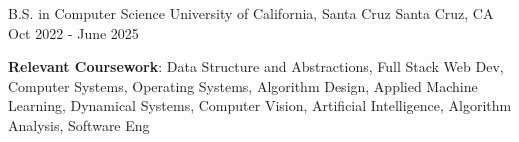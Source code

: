 \vspace{-2.0mm}
\begin{cventries}

  \cventry
    {B.S. in Computer Science} %
    {University of California, Santa Cruz} %
    {Santa Cruz, CA} %
    {Oct 2022 - June 2025} %
    {
      \begin{cvitems} %
        \item {\textbf{Relevant Coursework}: Data Structure and Abstractions, Full Stack Web Dev, Computer Systems, Operating Systems, Algorithm Design, Applied Machine Learning, Dynamical Systems, Computer Vision, Artificial Intelligence, Algorithm Analysis, Software Eng}
      \end{cvitems}
    }
\end{cventries}
